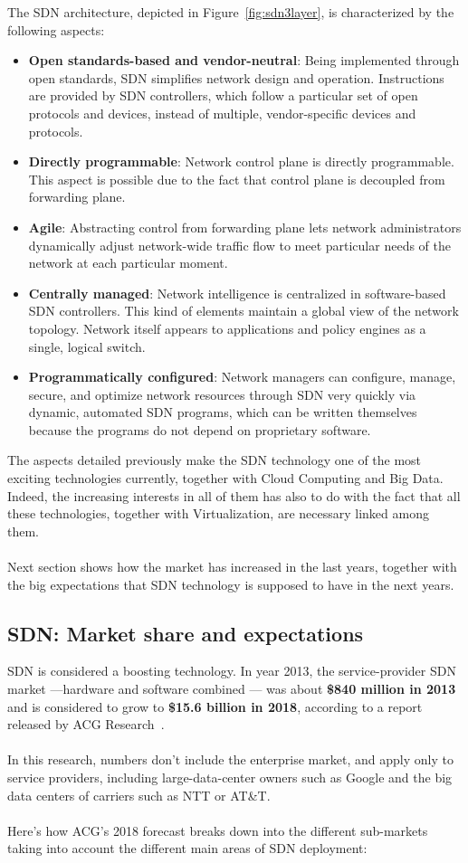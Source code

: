 \documentclass[a4paper, 12pt]{book}
\begin{document}
The SDN architecture, depicted in Figure~\ref{fig:sdn3layer}, is characterized by the following aspects:
\begin{itemize}
\item{\textbf{Open standards-based and vendor-neutral}}: Being implemented through open standards, SDN simplifies network design and operation. Instructions are provided by SDN controllers, which follow a particular set of open protocols and devices, instead of multiple, vendor-specific devices and protocols.
\item{\textbf{Directly programmable}}: Network control plane is directly programmable. This aspect is possible due to the fact that control plane is decoupled from forwarding plane.
\item{\textbf{Agile}}: Abstracting control from forwarding plane lets network administrators dynamically adjust network-wide traffic flow to meet particular needs of the network at each particular moment.
\item{\textbf{Centrally managed}}: Network intelligence is centralized in software-based SDN controllers. This kind of elements maintain a global view of the network topology. Network itself appears to applications and policy engines as a single, logical switch.
\item{\textbf{Programmatically configured}}: Network managers can configure, manage, secure, and optimize network resources through SDN very quickly via dynamic, automated SDN programs, which can be written themselves because the programs do not depend on proprietary software.
\end{itemize}
The aspects detailed previously make the SDN technology one of the most exciting technologies currently, together with Cloud Computing and Big Data. Indeed, the increasing interests in all of them has also to do with the fact that all these technologies, together with Virtualization, are necessary linked among them.\\
\\
Next section shows how the market has increased in the last years, together with the big expectations that SDN technology is supposed to have in the next years.

\subsection{SDN: Market share and expectations}
\label{subsec:sdn_marketshare}

SDN is considered a boosting technology. In year 2013, the service-provider SDN market —hardware and software combined — was about \textbf{\$840 million in 2013} and is considered to grow to \textbf{\$15.6 billion in 2018}, according to a report released by ACG Research~\cite{SDN2018expectations00}.\\
\\
In this research, numbers don’t include the enterprise market, and apply only to service providers, including large-data-center owners such as Google and the big data centers of carriers such as NTT or AT\&T.\\
\\
Here’s how ACG’s 2018 forecast breaks down into the different sub-markets taking into account the different main areas of SDN deployment:
\end{document}
